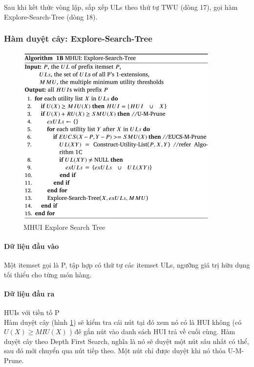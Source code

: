 Sau khi kết thức vòng lập, sắp xếp ULs theo thứ tự TWU (dòng 17), gọi hàm Explore-Search-Tree (dòng 18). 

\subsubsection{Hàm duyệt cây: Explore-Search-Tree }

\begin{figure}[ht]
\centering
\includegraphics[width=0.9\textwidth]{image/algo/algo2.PNG}
\caption{\label{fig:algo2} MHUI Explore Search Tree}
\end{figure}

\paragraph{Dữ liệu đầu vào} Một itemset gọi là P, tập hợp có thứ tự các itemset ULs, ngưỡng giá trị hữu dụng tối thiểu cho từng món hàng.

\paragraph{Dữ liệu đầu ra} HUIs với tiền tố P \\

Hàm duyệt cây (hình \ref{fig:algo2}) sẽ kiểm tra cái nút tại đó xem nó có là HUI không (có $U(X) \geq MIU(X)$ ) đê gắn nút vào danh sách HUI trả về cuối cùng. Hàm duyệt cây theo Depth First Search, nghĩa là nó sẽ duyệt một nút sâu nhất có thể, sau đó mới chuyển qua nút tiếp theo. Một nút chỉ được duyệt khi nó thỏa U-M-Prune. 

